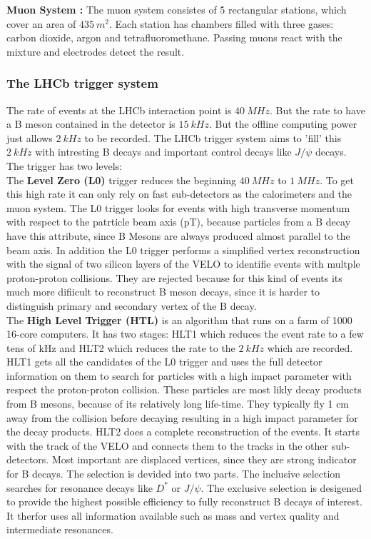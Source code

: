 \documentclass[english]{uzhpub}
\begin{document}
\textbf{Muon System \cite{bib:muonSys} :} The muon system consistes of 5 rectangular stations, which cover an area of $\SI{435}{m^2}$. Each station has chambers filled with three gases: carbon dioxide, argon and tetrafluoromethane. Passing muons react with the mixture and electrodes detect the result.


\subsubsection{The LHCb trigger system}
The rate of events at the LHCb interaction point is $\SI{40}{MHz}$. But the rate to have a B meson contained in the detector is $\SI{15}{kHz}$. But the offline computing power just allows $\SI{2}{kHz}$ to be recorded. The LHCb trigger system aims to 'fill' this $\SI{2}{kHz}$ with intresting B decays and important control decays like $J/ \psi$ decays. The trigger has two levels: \\
The \textbf{Level Zero (L0)} trigger reduces the beginning $\SI{40}{MHz}$ to $\SI{1}{MHz}$. To get this high rate it can only rely on fast sub-detectors as the calorimeters and the muon system. The L0 trigger looks for events with high transverse momentum with respect to the patrticle beam axis (pT), because particles from a B decay have this attribute, since B Mesons are always produced almost parallel to the beam axis.
In addition the L0 trigger performs a simplified vertex reconstruction with the signal of two silicon layers of the VELO to identifie events with multple proton-proton collisions. They are rejected because for this kind of events its much more difiicult to reconstruct B meson decays, since it is harder to distinguish primary and secondary vertex of the B decay. \\
The \textbf{High Level Trigger (HTL)} is an algorithm that runs on a farm of 1000 16-core computers. It has two stages: HLT1 which reduces the event rate to a few tens of kHz and HLT2 which reduces the rate to the $\SI{2}{kHz}$ which are recorded. HLT1 gets all the candidates of the L0 trigger and uses the full detector information on them to search for particles with a high impact parameter with respect the proton-proton collision. These particles are most likly decay products from B mesons, because of its relatively long life-time. They typically fly 1 cm away from the collision before decaying resulting in a high impact parameter for the decay products. HLT2 does a complete reconstruction of the events. It starts with the track of the VELO and connects them to the tracks in the other sub-detectors. Most important are displaced vertices, since they are strong indicator for B decays. The selection is devided into two parts. The inclusive selection searches for resonance decays like $D^*$ or $J/ \psi$. The exclusive selection is desigened to provide the highest possible efficiency to fully reconstruct B decays of interest. It therfor uses all information available such as mass and vertex quality and intermediate resonances.
\end{document}
